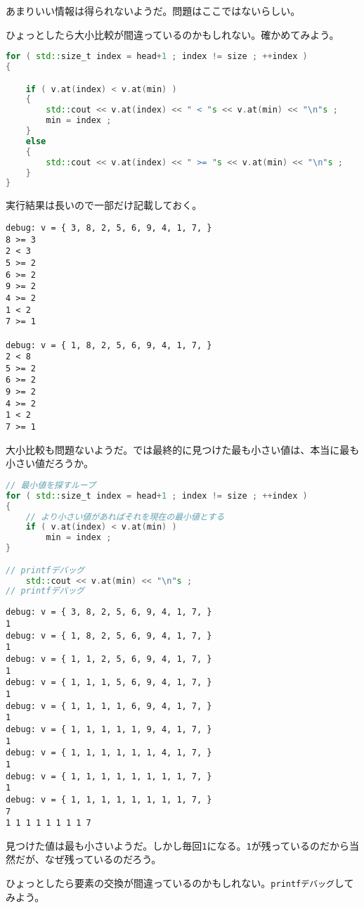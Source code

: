 あまりいい情報は得られないようだ。問題はここではないらしい。

ひょっとしたら大小比較が間違っているのかもしれない。確かめてみよう。

\begin{lstlisting}[language={C++}]
for ( std::size_t index = head+1 ; index != size ; ++index )
{

    if ( v.at(index) < v.at(min) )
    {
        std::cout << v.at(index) << " < "s << v.at(min) << "\n"s ;
        min = index ;
    }
    else
    {
        std::cout << v.at(index) << " >= "s << v.at(min) << "\n"s ;
    }
}
\end{lstlisting}

実行結果は長いので一部だけ記載しておく。

\begin{lstlisting}[style=terminal]
debug: v = { 3, 8, 2, 5, 6, 9, 4, 1, 7, }
8 >= 3
2 < 3
5 >= 2
6 >= 2
9 >= 2
4 >= 2
1 < 2
7 >= 1

debug: v = { 1, 8, 2, 5, 6, 9, 4, 1, 7, }
2 < 8
5 >= 2
6 >= 2
9 >= 2
4 >= 2
1 < 2
7 >= 1
\end{lstlisting}

大小比較も問題ないようだ。では最終的に見つけた最も小さい値は、本当に最も小さい値だろうか。

\begin{lstlisting}[language={C++}]
// 最小値を探すループ
for ( std::size_t index = head+1 ; index != size ; ++index )
{
    // より小さい値があればそれを現在の最小値とする
    if ( v.at(index) < v.at(min) )
        min = index ;
}

// printfデバッグ
    std::cout << v.at(min) << "\n"s ;
// printfデバッグ 
\end{lstlisting}

\begin{lstlisting}[style=terminal]
debug: v = { 3, 8, 2, 5, 6, 9, 4, 1, 7, }
1
debug: v = { 1, 8, 2, 5, 6, 9, 4, 1, 7, }
1
debug: v = { 1, 1, 2, 5, 6, 9, 4, 1, 7, }
1
debug: v = { 1, 1, 1, 5, 6, 9, 4, 1, 7, }
1
debug: v = { 1, 1, 1, 1, 6, 9, 4, 1, 7, }
1
debug: v = { 1, 1, 1, 1, 1, 9, 4, 1, 7, }
1
debug: v = { 1, 1, 1, 1, 1, 1, 4, 1, 7, }
1
debug: v = { 1, 1, 1, 1, 1, 1, 1, 1, 7, }
1
debug: v = { 1, 1, 1, 1, 1, 1, 1, 1, 7, }
7
1 1 1 1 1 1 1 1 7 
\end{lstlisting}

見つけた値は最も小さいようだ。しかし毎回\texttt{1}になる。\texttt{1}が残っているのだから当然だが、なぜ残っているのだろう。

ひょっとしたら要素の交換が間違っているのかもしれない。\texttt{printfデバッグ}してみよう。

